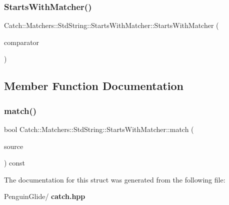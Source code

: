 \subsubsection{StartsWithMatcher()}
{\footnotesize\ttfamily Catch\+::\+Matchers\+::\+Std\+String\+::\+Starts\+With\+Matcher\+::\+Starts\+With\+Matcher (\begin{DoxyParamCaption}\item[{\textbf{ Cased\+String} const \&}]{comparator }\end{DoxyParamCaption})}



\subsection{Member Function Documentation}
\mbox{\label{struct_catch_1_1_matchers_1_1_std_string_1_1_starts_with_matcher_a7da4747aed0c48989d8be59a89e2b7fb}} 
\subsubsection{match()}
{\footnotesize\ttfamily bool Catch\+::\+Matchers\+::\+Std\+String\+::\+Starts\+With\+Matcher\+::match (\begin{DoxyParamCaption}\item[{std\+::string const \&}]{source }\end{DoxyParamCaption}) const\hspace{0.3cm}{\ttfamily [override]}}



The documentation for this struct was generated from the following file\+:\begin{DoxyCompactItemize}
\item 
Penguin\+Glide/\textbf{ catch.\+hpp}\end{DoxyCompactItemize}
